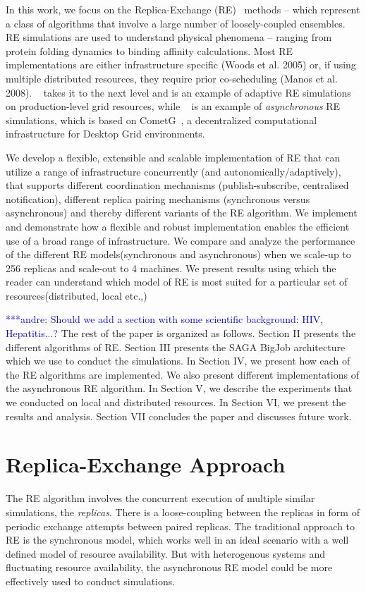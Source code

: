 \documentclass{rspublic}
\newcommand{\alnote}[1]{ {\textcolor{blue} { ***andre: #1 }}}
\newcommand{\alnote}[1]{}
\begin{document}
In this work, we focus on the Replica-Exchange (RE)~\cite{hansmann,Sugita:1999rm} 
methods -- which represent a class of
algorithms that involve a large number of loosely-coupled ensembles.
RE simulations are used to understand physical phenomena -- ranging
from protein folding dynamics to binding affinity calculations. Most RE implementations are either infrastructure specific (Woods et al. 2005)
or, if using multiple distributed resources, they require prior co-scheduling
(Manos et al. 2008). ~\cite{Luckow:2008fp} takes it to the next level and is an example of adaptive RE simulations on production-level grid resources, while ~\cite{parashar_arepex} is an example of \emph{asynchronous} RE simulations, which is based on CometG~\cite{Li:2005:CSC:1090948.1091381}, a decentralized computational infrastructure for Desktop Grid environments.

We develop a flexible, extensible and scalable
implementation of RE that can utilize a range of infrastructure
concurrently (and autonomically/adaptively), that supports different
coordination mechanisms (publish-subscribe, centralised notification),
different replica pairing mechanisms (synchronous versus asynchronous)
and thereby different variants of the RE algorithm. We implement and
demonstrate how a flexible and robust implementation enables the
efficient use of a broad range of infrastructure. We compare and analyze the performance of the different RE models(synchronous and asynchronous) when we scale-up to 256 replicas and scale-out to 4 machines. 
We present results using which the reader can understand which model of RE is most suited for a particular set of resources(distributed, local etc.,)

\alnote{Should we add a section with some scientific background: HIV, Hepatitis...?}
The rest of the paper is organized as follows. Section II presents the different algorithms of RE. Section III  presents the SAGA BigJob architecture which we use to conduct the simulations. In Section IV, we present how each of the RE algorithms are implemented. We also present different implementations of the asynchronous RE algorithm. In Section V, we describe the experiments that we conducted on local and distributed resources. In Section VI, we present the results and analysis. Section VII concludes the paper and discusses future work.

\section{Replica-Exchange Approach}
\label{sec:repex-approach}
The RE algorithm involves the concurrent execution of multiple similar
simulations, the \emph{replicas}.  There is a loose-coupling between
the replicas in form of periodic exchange attempts between paired
replicas. The traditional approach to RE is the synchronous model, which works well in an ideal scenario with a well defined model of resource availability. But with heterogenous systems and fluctuating resource availability, the asynchronous RE model could be more effectively used to conduct simulations.
\end{document}
